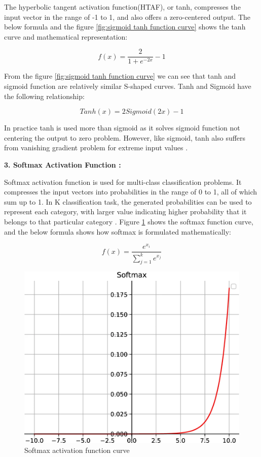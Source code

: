 The hyperbolic tangent activation function(HTAF), or tanh, compresses the input vector in the range of -1 to 1, and also offers a zero-centered output. The below formula and the figure \ref{fig:sigmoid tanh function curve} shows the tanh curve and mathematical representation:

\[
    f(x) = \frac{2}{1 + e^{-2x}} - 1
\]

From the figure \ref{fig:sigmoid tanh function curve} we can see that tanh and sigmoid function are relatively similar S-shaped curves. Tanh and Sigmoid have the following relationship:

\[
    Tanh(x) = 2Sigmoid(2x) - 1
\]

In practice tanh is used more than sigmoid as it solves sigmoid function not centering the output to zero problem. However, like sigmoid, tanh also suffers from vanishing gradient problem for extreme input values \cite{Zhao2024}.

\textbf{3. Softmax Activation Function :}

Softmax activation function is used for multi-class classification problems. It compresses the input vectors into probabilities in the range of 0 to 1, all of which sum up to 1. In K classification task, the generated probabilities can be used to represent each category, with larger value indicating higher probability that it belongs to that particular category \cite{Zhao2024}. Figure \ref{fig:softmax function curve} shows the softmax function curve, and the below formula shows how softmax is formulated mathematically:

\[
    f(x) = \frac{e^{x_i}}{\sum_{j=1}^{k} e^{x_j}}
\]

\begin{figure}[H]
    \centering
    \includegraphics[width=1\textwidth]{Rohit_Master_Thesis//Images/softmax.png}
    \caption{Softmax activation function curve \cite{Zhao2024}}
    \label{fig:softmax function curve}
\end{figure}

